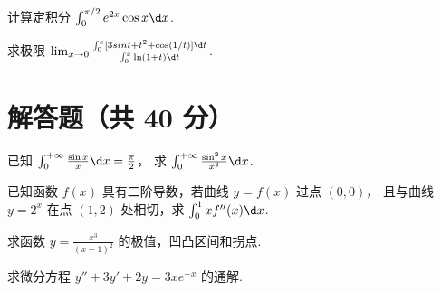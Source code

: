 \documentclass[quiet]{ctexart}
\begin{document}
\begin{problem}
  计算定积分 $\int_0^{\pi/2} e^{2x} \cos x \d x$.
\end{problem}
\begin{solution}
  
\end{solution}

\begin{problem}
  求极限 $\lim_{x \to 0}
  \frac{\int_0^x [3 sin t + t^2 + \cos(1/t)] \d t}{\int_0^x \ln(1 + t) \d t}$.
\end{problem}
\begin{solution}
  
\end{solution}

\section{解答题（共 40 分）}

\begin{problem}[7 pt]
  已知 $\int_0^{+\infty} \frac{\sin x}{x} \d x = \frac\pi2$，
  求 $\int_0^{+\infty} \frac{\sin^2 x}{x^2} \d x$.
\end{problem}
\begin{solution}
  
\end{solution}

\begin{problem}[7 pt]
  已知函数 $f(x)$ 具有二阶导数，若曲线 $y = f(x)$ 过点 $(0,0)$，
  且与曲线 $y = 2^x$ 在点 $(1,2)$ 处相切，求 $\int_0^1 xf''(x) \d x$.
\end{problem}
\begin{solution}
  
\end{solution}

\begin{problem}[7 pt]
  求函数 $y = \frac{x^3}{(x - 1)^2}$ 的极值，凹凸区间和拐点.
\end{problem}
\begin{solution}
  
\end{solution}

\begin{problem}[7 pt]
  求微分方程 $y'' + 3y' + 2y = 3xe^{-x}$ 的通解.
\end{problem}
\begin{solution}
  
\end{solution}
\end{document}
